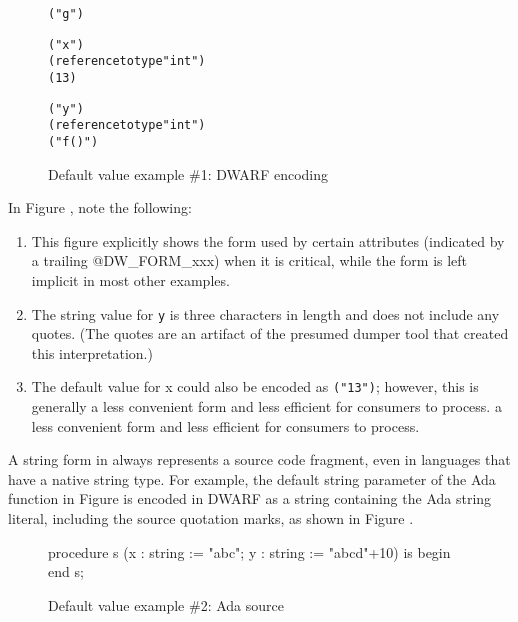 \begin{figure}[h]
\begin{dwflisting}
\begin{alltt}

    \DWTAGsubprogram
        \DWATname ("g")

        \DWTAGformalparameter
           \DWATname ("x")
           \DWATtype (reference to type "int")
           \DWATdefaultvalue@\DWFORMsdata (13)

        \DWTAGformalparameter
           \DWATname ("y")
           \DWATtype (reference to type "int")
           \DWATdefaultvalue@\DWFORMstring ("f()")

\end{alltt}
\end{dwflisting}
\caption{Default value example \#1: DWARF encoding}
\label{fig:defaultvalueexampleoneDWARF}
\end{figure}

\bb
In Figure , note the following:
\begin{enumerate}
\item
This figure explicitly shows the form used by certain attributes
(indicated by a trailing @DW\_FORM\_xxx) when it is critical, while
the form is left implicit in most other examples.
\item
The string value for \texttt{y} is three characters in length and
does not include any quotes. (The quotes are an artifact of the
presumed dumper tool that created this interpretation.)
\item
The default value for x could also be encoded as
\texttt{\DWATdefaultvalue@\DWFORMstring("13")}; however, this is generally
a less convenient form and less efficient for consumers to process.
a less convenient form and less efficient for consumers to process.
\eb
\end{enumerate}

\clearpage
\bb
A string form in \DWATdefaultvalue{} always represents a source
code fragment, even in languages that have a native string type. For
example, the default string parameter of the Ada function in Figure
is encoded in DWARF as a string containing the Ada string literal,
including the source quotation marks, as shown in 
Figure .
\eb

\begin{figure} [h]
\begin{nlnlisting}
    procedure s (x : string := "abc";
                 y : string := "abcd"+10) is
    begin
    end s;

\end{nlnlisting} 
\caption{Default value example \#2: Ada source}
\label{fig:defaultvalueexampletwosource}
\end{figure}

